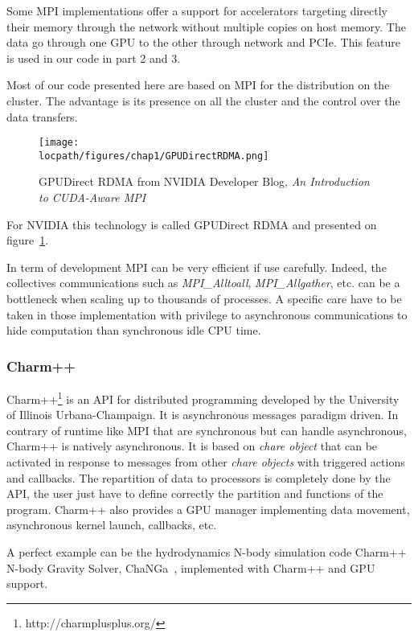 Some MPI implementations offer a support for accelerators targeting directly their memory through the network without multiple copies on host memory. 
The data go through one GPU to the other through network and PCIe.
This feature is used in our code in part 2 and 3.

Most of our code presented here are based on MPI for the distribution on the cluster. 
The advantage is its presence on all the cluster and the control over the data transfers. 

\begin{figure}
\begin{center}
\texttt{[image: \\locpath/figures/chap1/GPUDirectRDMA.png]}
\caption{GPUDirect RDMA from NVIDIA Developer Blog, \textit{An Introduction to CUDA-Aware MPI
}}
\label{fig:1_HPC:gpudirect_rdma}
\end{center}
\end{figure}

For NVIDIA this technology is called GPUDirect RDMA and presented on figure~\ref{fig:1_HPC:gpudirect_rdma}. 

In term of development MPI can be very efficient if use carefully. 
Indeed, the collectives communications such as \textit{MPI\_Alltoall}, \textit{MPI\_Allgather}, etc. can be a bottleneck when scaling up to thousands of processes. 
A specific care have to be taken in those implementation with privilege to asynchronous communications to hide computation than synchronous idle CPU time. 

\subsubsection{Charm++}
Charm++\footnote{http://charmplusplus.org/} is an API for distributed programming developed by the University of Illinois Urbana-Champaign.
It is asynchronous messages paradigm driven.
In contrary of runtime like MPI that are synchronous but can handle asynchronous, Charm++ is natively asynchronous. 
It is based on \textit{chare object} that can be activated in response to messages from other \textit{chare objects} with triggered actions and callbacks. 
The repartition of data to processors is completely done by the API, the user just have to define correctly the partition and functions of the program. 
Charm++ also provides a GPU manager implementing data movement, asynchronous kernel launch, callbacks, etc.

A perfect example can be the hydrodynamics N-body simulation code Charm++ N-body Gravity Solver, ChaNGa~\cite{jetley2010scaling}, implemented with Charm++ and GPU support. 

